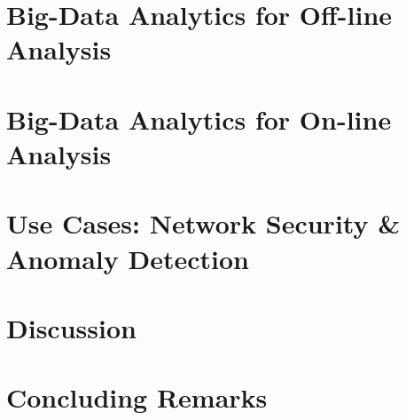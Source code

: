 \documentclass[10pt, conference, letterpaper]{IEEEtran}
\begin{document}
\section{Big-Data Analytics for Off-line Analysis}\label{sectionV}
\section{Big-Data Analytics for On-line Analysis}\label{sectionVI}
\section{Use Cases: Network Security \& Anomaly Detection}\label{sectionVII}
\section{Discussion}\label{sectionVIII}
\section{Concluding Remarks}\label{sectionIX}
\end{document}
